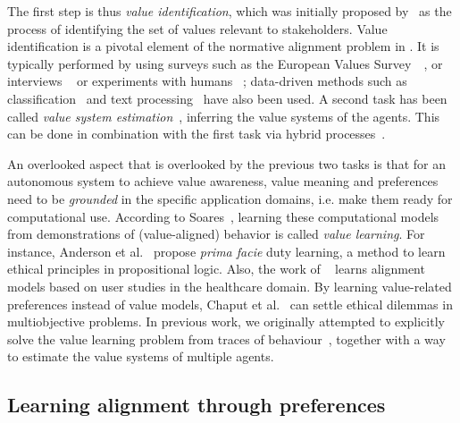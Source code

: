 \documentclass{ecai}
\begin{document}
The first step is thus \emph{value identification}, which was initially proposed by~\cite{Liscio2021Axies} as the process of identifying the set of values relevant to stakeholders. Value identification is a pivotal element of the normative alignment problem in \cite{Gabriel2020}. It is typically performed by using surveys such as the European Values Survey~\cite{EuropeanValuesStudySEETHIS}~\cite{schwartz2005schwartz,Ranganathan2021,Hecht2023}, or interviews ~\cite{Leitner2008interviewToValueIdentification} or experiments with humans ~\cite{Janssen2021,Iqbal2024ValuesFromGoalModels,googleVeilOfIgnorance2023}; data-driven methods such as classification~\cite{QiuZhaoLiLuPengGaoZhu2022ValueNetDataset} and text processing~\cite{wilson2018valueidentificationtext} have also been used. A second task has been called \emph{value system estimation}~\cite{Liscio2023Sociotechnical}, inferring the value systems of the agents. This can be done in combination with the first task via hybrid processes~\cite{Liscio2022Axies2}.

An overlooked aspect that is overlooked by the previous two tasks is that for an autonomous system to achieve value awareness, value meaning and preferences need to be \textit{grounded} in the specific application domains, i.e. make them ready for computational use. According to Soares~\cite{Soares2018ValueLearningProblem}, learning these computational models from demonstrations of (value-aligned) behavior is called \textit{value learning}. For instance, Anderson et al.~\cite{Anderson2018GenEthILP} propose \textit{prima facie} duty learning, a method to learn ethical principles in propositional logic. Also, the work of ~\cite{userStudyLearningValues} learns alignment models based on user studies in the healthcare domain. By learning value-related preferences instead of value models, Chaput et al.~\cite{Chaput2023CONTEXTUALpreferenceToSettleDilemmas} can settle ethical dilemmas in multiobjective problems. In previous work, we originally attempted to explicitly solve the value learning problem from traces of behaviour~\cite{andres2024vecompPaper}, together with a way to estimate the value systems of multiple agents. 

     
\subsection{Learning alignment through preferences}\label{sec:stateoftheartIRL}
\end{document}

